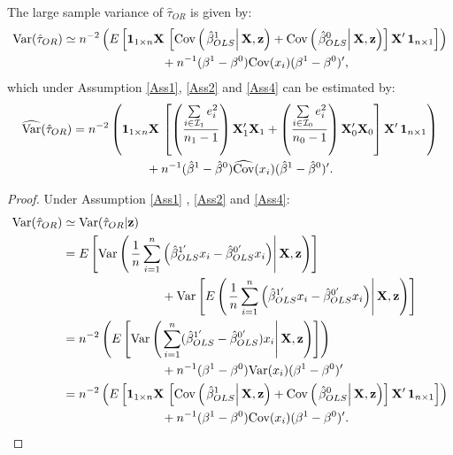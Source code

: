 \documentclass[11pt]{article}
\newcommand{\Var}{{\mbox{Var}}}
\newcommand{\Cov}{{\mbox{Cov}}}
\newcommand{\z}{{\bf z}}
\newcommand{\X}{{\bf X}}
\begin{document}
\noindent The large sample variance of $\hat \tau_{OR}$ is given by:
\begin{align*}
\mbox{Var}(\hat \tau_{OR})&\simeq  n^{-2} \left(   E\left[ \boldsymbol{1}_{1\times n}\X \, \left[ \mbox{Cov}\left( \left. \hat\beta^{1}_{OLS} \right|  \X,\z \right) + \mbox{Cov}\left( \left. \hat\beta^{0}_{OLS} \right|  \X,\z \right)\right] \X' \, \boldsymbol{1}_{n\times 1} \right] \right)\\
&\qquad \qquad \qquad \qquad + n^{-1}(\beta^1-\beta^0)\mbox{Cov}(x_i)(\beta^1-\beta^0)',
\end{align*}
which under Assumption \ref{Ass1}, \ref{Ass2} and \ref{Ass4} can be estimated by:
\begin{align*}
\widehat{\Var}(\hat \tau_{OR})& =  n^{-2} \left(  \boldsymbol{1}_{1\times n}\X \, \left[\left(\frac{\sum \limits_{i \in \mathcal{I}_1}e_i^2}{n_1-1} \right)\X_1' \X_1 + \left(\frac{\sum \limits_{i \in \mathcal{I}_0}e_i^2}{n_0-1} \right)\X_0' \X_0\right] \X' \, \boldsymbol{1}_{n\times 1} \right)\\
&\qquad \qquad \qquad  + n^{-1}(\hat\beta^1-\hat\beta^0)\widehat\Cov(x_i)(\hat\beta^1-\hat\beta^0)'.
\end{align*}
\begin{proof}
\noindent Under Assumption \ref{Ass1} , \ref{Ass2}  and \ref{Ass4}:
\begin{align*}
\mbox{Var}(\hat \tau_{OR})&\simeq \mbox{Var}(\hat \tau_{OR}|\z)\\
&=E\left[ \mbox{Var}\left( \left. \frac{1}{n}\sum \limits_{i =1}^n\left( \hat\beta^{1'}_{OLS}x_i-\hat\beta^{0'}_{OLS}x_i\right) \right|  \X, \z \right) \right]\\
&\qquad \qquad \qquad \qquad + \mbox{Var}\left[ E\left( \left. \frac{1}{n}\sum \limits_{i =1}^n\left( \hat\beta^{1'}_{OLS}x_i-\hat\beta^{0'}_{OLS}x_i\right) \right|  \X, \z \right) \right] \\
&= n^{-2} \left(   E\left[ \mbox{Var}\left( \left.\sum \limits_{i =1}^n (\hat\beta^{1'}_{OLS}-\hat\beta^{0'}_{OLS})x_i \right|  \X, \z\right)   \right] \right) \\
&\qquad \qquad \qquad \qquad +n^{-1}(\beta^1-\beta^0)\mbox{Var}(x_i) (\beta^1-\beta^0)'  \\
&= n^{-2} \left(   E\left[ \boldsymbol{1}_{1\times n}\X \, \left[ \mbox{Cov}\left( \left. \hat\beta^{1}_{OLS} \right|  \X,\z \right) + \mbox{Cov}\left( \left. \hat\beta^{0}_{OLS} \right|  \X,\z \right)\right] \X' \, \boldsymbol{1}_{n\times 1} \right] \right)\\
&\qquad \qquad \qquad \qquad + n^{-1}(\beta^1-\beta^0)\mbox{Cov}(x_i)(\beta^1-\beta^0)'.
\end{align*}
\end{proof}
\end{document}
